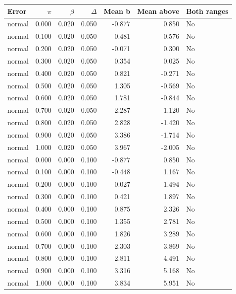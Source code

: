 \begin{tabular}{lrrrrrl}
\toprule
Error & $\pi$ & $\beta$ & $\Delta$ & Mean b & Mean above & Both ranges \\
\midrule
normal & 0.000 & 0.020 & 0.050 & -0.877 & 0.850 & No \\
normal & 0.100 & 0.020 & 0.050 & -0.481 & 0.576 & No \\
normal & 0.200 & 0.020 & 0.050 & -0.071 & 0.300 & No \\
normal & 0.300 & 0.020 & 0.050 & 0.354 & 0.025 & No \\
normal & 0.400 & 0.020 & 0.050 & 0.821 & -0.271 & No \\
normal & 0.500 & 0.020 & 0.050 & 1.305 & -0.569 & No \\
normal & 0.600 & 0.020 & 0.050 & 1.781 & -0.844 & No \\
normal & 0.700 & 0.020 & 0.050 & 2.287 & -1.120 & No \\
normal & 0.800 & 0.020 & 0.050 & 2.828 & -1.420 & No \\
normal & 0.900 & 0.020 & 0.050 & 3.386 & -1.714 & No \\
normal & 1.000 & 0.020 & 0.050 & 3.967 & -2.005 & No \\
normal & 0.000 & 0.000 & 0.100 & -0.877 & 0.850 & No \\
normal & 0.100 & 0.000 & 0.100 & -0.448 & 1.167 & No \\
normal & 0.200 & 0.000 & 0.100 & -0.027 & 1.494 & No \\
normal & 0.300 & 0.000 & 0.100 & 0.421 & 1.897 & No \\
normal & 0.400 & 0.000 & 0.100 & 0.875 & 2.326 & No \\
normal & 0.500 & 0.000 & 0.100 & 1.355 & 2.781 & No \\
normal & 0.600 & 0.000 & 0.100 & 1.826 & 3.289 & No \\
normal & 0.700 & 0.000 & 0.100 & 2.303 & 3.869 & No \\
normal & 0.800 & 0.000 & 0.100 & 2.811 & 4.491 & No \\
normal & 0.900 & 0.000 & 0.100 & 3.316 & 5.168 & No \\
normal & 1.000 & 0.000 & 0.100 & 3.834 & 5.951 & No \\
\bottomrule
\end{tabular}
\par\medskip
